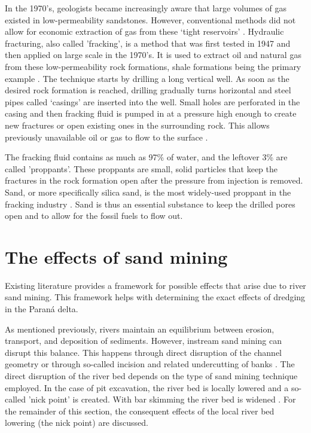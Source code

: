 In the 1970's, geologists became increasingly aware that large volumes of gas existed in low-permeability sandstones. However, conventional methods did not allow for economic extraction of gas from these `tight reservoirs' \autocite{lawGasTightReservoirs1992}. Hydraulic fracturing, also called 'fracking', is a method that was first tested in 1947 and then applied on large scale in the 1970's. It is used to extract oil and natural gas from these low-permeability rock formations, shale formations being the primary example \autocite{denchakFracking1012019}. The technique starts by drilling a long vertical well. As soon as the desired rock formation is reached, drilling gradually turns horizontal and steel pipes called `casings' are inserted into the well. Small holes are perforated in the casing and then fracking fluid is pumped in at a pressure high enough to create new fractures or open existing ones in the surrounding rock. This allows previously unavailable oil or gas to flow to the surface \autocite{denchakFracking1012019}.

The fracking fluid contains as much as 97\% of water, and the leftover 3\% are called 'proppants'. These proppants are small, solid particles that keep the fractures in the rock formation open after the pressure from injection is removed. Sand, or more specifically silica sand, is the most widely-used proppant in the fracking industry \autocite{denchakFracking1012019}. Sand is thus an essential substance to keep the drilled pores open and to allow for the fossil fuels to flow out.


\section{The effects of sand mining}
Existing literature provides a framework for possible effects that arise due to river sand mining. This framework helps with determining the exact effects of dredging in the Paraná delta.

As mentioned previously, rivers maintain an equilibrium between erosion, transport, and deposition of sediments. However, instream sand mining can disrupt this balance. This happens through direct disruption of the channel geometry or through so-called incision and related undercutting of banks \autocite{sand-mining-boek}. The direct disruption of the river bed depends on the type of sand mining technique employed. In the case of pit excavation, the river bed is locally lowered and a so-called 'nick point' is created. With bar skimming the river bed is widened \autocite{sand-mining-boek}. For the remainder of this section, the consequent effects of the local river bed lowering (the nick point) are discussed.

